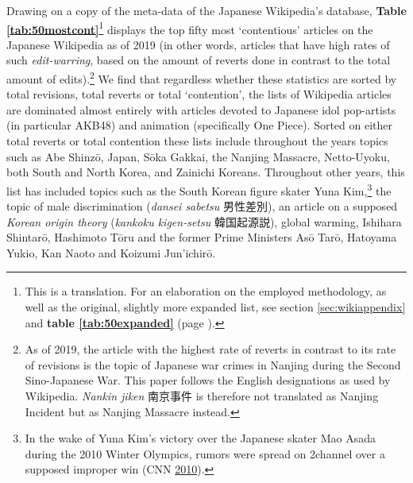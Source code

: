 \documentclass[10pt,british,A4paper,twoside]{memoir}
\begin{document}
Drawing on a copy of the meta-data of the Japanese Wikipedia's database,
\textbf{Table \ref{tab:50mostcont}}\footnote{This is a translation. For
  an elaboration on the employed methodology, as well as the original,
  slightly more expanded list, see section \ref{sec:wikiappendix} and
  \textbf{table \ref{tab:50expanded}} (page \pageref{tab:50expanded}).}
displays the top fifty most `contentious' articles on the Japanese
Wikipedia as of 2019 (in other words, articles that have high rates of
such \emph{edit-warring}, based on the amount of reverts done in
contrast to the total amount of edits).\footnote{As of 2019, the article
  with the highest rate of reverts in contrast to its rate of revisions
  is the topic of Japanese war crimes in Nanjing during the Second
  Sino-Japanese War. This paper follows the English designations as used
  by Wikipedia. \emph{Nankin jiken} 南京事件 is therefore not translated
  as Nanjing Incident but as Nanjing Massacre instead.} We find that regardless whether these statistics are sorted by
total revisions, total reverts or total `contention', the lists of
Wikipedia articles are dominated almost entirely with articles devoted
to Japanese idol pop-artists (in particular AKB48) and animation
(specifically One Piece). Sorted on either total reverts or total
contention these lists include throughout the years topics such as Abe
Shinzō, Japan, Sōka Gakkai, the Nanjing Massacre, Netto-Uyoku, both
South and North Korea, and Zainichi Koreans. Throughout other years,
this list has included topics such as the South Korean figure skater
Yuna Kim,\footnote{In the wake of Yuna Kim's victory over the Japanese
  skater Mao Asada during the 2010 Winter Olympics, rumors were spread
  on 2channel over a supposed improper win (CNN
  \protect\hyperlink{ref-cnn_korean_2010}{2010}).} the topic of male
discrimination (\emph{dansei sabetsu} 男性差別), an article on a
supposed \emph{Korean origin theory} (\emph{kankoku kigen-setsu}
韓国起源説), global warming, Ishihara Shintarō, Hashimoto Tōru and the
former Prime Ministers Asō Tarō, Hatoyama Yukio, Kan Naoto and Koizumi
Jun'ichirō.
\end{document}
